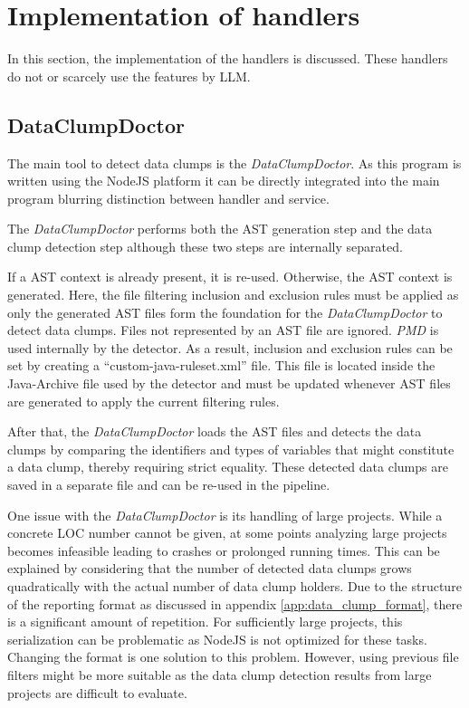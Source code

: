 \section{Implementation of handlers} \label{sec:step_impl}
In this section, the implementation of the handlers is discussed. These handlers do not or scarcely use the features by \ac{LLM}. 
\subsection{DataClumpDoctor}

The main tool to detect  data clumps is the \textit{DataClumpDoctor}. As this program is written using the NodeJS platform it can be directly integrated into the main program blurring distinction between handler and service.

The \textit{DataClumpDoctor} performs both the \ac{AST} generation step and the data clump detection step although these two steps are internally separated.

If a \ac{AST} context is already present, it is re-used. Otherwise, the \ac{AST} context is generated. Here, the file filtering inclusion and exclusion rules must be applied as only the generated \ac{AST} files form the foundation for the \textit{DataClumpDoctor} to detect data clumps. Files  not represented by an \ac{AST} file are ignored. \textit{PMD} is used internally by the detector. As a result, inclusion and exclusion rules can be set by creating a \enquote{custom-java-ruleset.xml} file. This file is located inside the Java-Archive file used by the detector and must be updated whenever \ac{AST} files are generated to apply the current filtering rules. 

After that, the \textit{DataClumpDoctor} loads the \ac{AST} files and detects the data clumps by comparing the identifiers and types of variables that might constitute a data clump, thereby requiring strict equality. These detected data clumps are saved in a separate file and can be re-used in the pipeline. 

One issue with the \textit{DataClumpDoctor} is its handling of large projects. While a concrete \ac{LOC} number cannot be given, at some points analyzing large projects becomes infeasible leading to crashes or prolonged running times. This can be explained by considering that  the number of detected data clumps grows quadratically with the actual number of data clump holders. Due to the structure of the reporting format as discussed in appendix \ref{app:data_clump_format}, there is a significant amount of repetition. For sufficiently large projects, this serialization can be problematic as NodeJS is not optimized for these tasks. Changing the format is one solution to this problem. However, using previous file filters might be more suitable as the data clump detection results from large projects are difficult to evaluate. 

